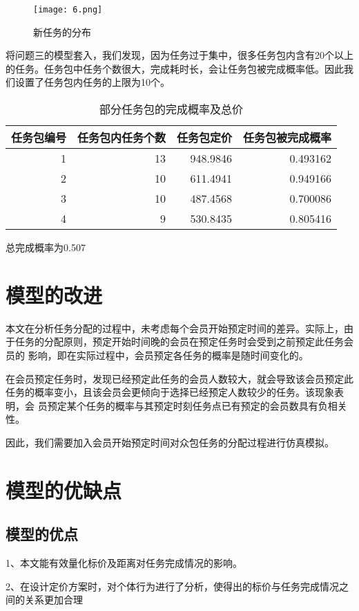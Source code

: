 \documentclass{cumcmthesis}
\begin{document}
\begin{figure}[!h]
	\centering
	\texttt{[image: 6.png]}
	\caption{新任务的分布}
\end{figure}
将问题三的模型套入，我们发现，因为任务过于集中，很多任务包内含有20个以上的任务。任务包中任务个数很大，完成耗时长，会让任务包被完成概率低。因此我们设置了任务包内任务的上限为10个。
\begin{table}[!htbp]
	\caption{ 部分任务包的完成概率及总价}\label{tab001} \centering
	\begin{tabular}{rrrr}
		\toprule[1.5pt]
		\multicolumn{1}{l}{任务包编号} & \multicolumn{1}{l}{任务包内任务个数} & \multicolumn{1}{l}{任务包定价} & \multicolumn{1}{l}{任务包被完成概率} \\
		\midrule[1pt]
		1     & 13    & 948.9846 & 0.493162 \\
		2     & 10    & 611.4941 & 0.949166 \\
		3     & 10    & 487.4568 & 0.700086 \\
		4     & 9     & 530.8435 & 0.805416 \\
		\bottomrule[1.5pt]
	\end{tabular}%
\end{table}
总完成概率为0.507

\section{模型的改进}
本文在分析任务分配的过程中，未考虑每个会员开始预定时间的差异。实际上，由 于任务的分配原则，预定开始时间晚的会员在预定任务时会受到之前预定此任务会员的 影响，即在实际过程中，会员预定各任务的概率是随时间变化的。

在会员预定任务时，发现已经预定此任务的会员人数较大，就会导致该会员预定此 任务的概率变小，且该会员会更倾向于选择已经预定人数较少的任务。该现象表明，会 员预定某个任务的概率与其预定时刻任务点已有预定的会员数具有负相关性。 

因此，我们需要加入会员开始预定时间对众包任务的分配过程进行仿真模拟。

\section{模型的优缺点}
\subsection{模型的优点}
1、本文能有效量化标价及距离对任务完成情况的影响。 

2、在设计定价方案时，对个体行为进行了分析，使得出的标价与任务完成情况之 间的关系更加合理
\end{document}
